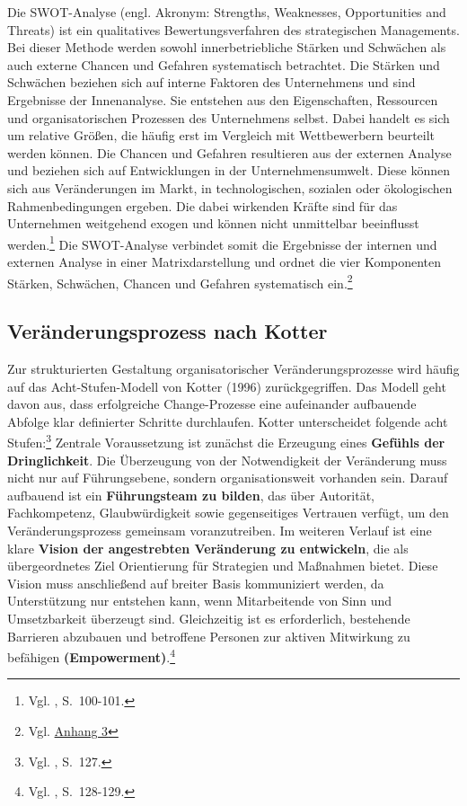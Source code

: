 \documentclass[
    12pt, 
    a4paper,
    ]{scrartcl} %
\begin{document}
Die SWOT-Analyse (engl. Akronym: Strengths, Weaknesses, Opportunities and Threats) ist ein qualitatives Bewertungsverfahren des strategischen Managements. Bei dieser Methode werden sowohl innerbetriebliche Stärken und Schwächen als auch externe Chancen und Gefahren systematisch betrachtet. Die Stärken und Schwächen beziehen sich auf interne Faktoren des Unternehmens und sind Ergebnisse der Innenanalyse. Sie entstehen aus den Eigenschaften, Ressourcen und organisatorischen Prozessen des Unternehmens selbst. Dabei handelt es sich um relative Größen, die häufig erst im Vergleich mit Wettbewerbern beurteilt werden können. Die Chancen und Gefahren resultieren aus der externen Analyse und beziehen sich auf Entwicklungen in der Unternehmensumwelt. Diese können sich aus Veränderungen im Markt, in technologischen, sozialen oder ökologischen Rahmenbedingungen ergeben. Die dabei wirkenden Kräfte sind für das Unternehmen weitgehend exogen und können nicht unmittelbar beeinflusst werden.\footnote{Vgl. \cite{Koch_Geschaeftsprozessmanagement}, S.~100-101.}
Die SWOT-Analyse verbindet somit die Ergebnisse der internen und externen Analyse in einer Matrixdarstellung und ordnet die vier Komponenten Stärken, Schwächen, Chancen und Gefahren systematisch ein.\footnote{Vgl. \hyperref[sec:Anhang3]{Anhang 3}} 

\subsection{Veränderungsprozess nach Kotter}
Zur strukturierten Gestaltung organisatorischer Veränderungsprozesse wird häufig auf das Acht-Stufen-Modell von Kotter (1996) zurückgegriffen. Das Modell geht davon aus, dass erfolgreiche Change-Prozesse eine aufeinander aufbauende Abfolge klar definierter Schritte durchlaufen. Kotter unterscheidet folgende acht Stufen:\footnote{Vgl. \cite{Rosenstiel_ChangeManagement}, S.~127.} 
Zentrale Voraussetzung ist zunächst die Erzeugung eines \textbf{Gefühls der Dringlichkeit}. Die Überzeugung von der Notwendigkeit der Veränderung muss nicht nur auf Führungsebene, sondern organisationsweit vorhanden sein. Darauf aufbauend ist ein \textbf{Führungsteam zu bilden}, das über Autorität, Fachkompetenz, Glaubwürdigkeit sowie gegenseitiges Vertrauen verfügt, um den Veränderungsprozess gemeinsam voranzutreiben.
Im weiteren Verlauf ist eine klare \textbf{Vision der angestrebten Veränderung zu entwickeln}, die als übergeordnetes Ziel Orientierung für Strategien und Maßnahmen bietet. Diese Vision muss anschließend auf breiter Basis kommuniziert werden, da Unterstützung nur entstehen kann, wenn Mitarbeitende von Sinn und Umsetzbarkeit überzeugt sind. Gleichzeitig ist es erforderlich, bestehende Barrieren abzubauen und betroffene Personen zur aktiven Mitwirkung zu befähigen \textbf{(Empowerment)}.\footnote{Vgl. \cite{Rosenstiel_ChangeManagement}, S.~128-129.} 
\end{document}
